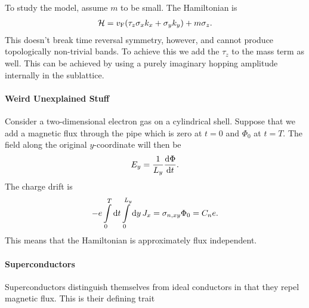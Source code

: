 To study the model, assume $m$ to be small. The Hamiltonian is
\begin{align*}
	\mathcal{H} = v_{\text{F}}(\tau_{z}\sigma_{x}k_{x} + \sigma_{y}k_{y}) + m\sigma_{z}.
\end{align*}
This doesn't break time reversal symmetry, however, and cannot produce topologically non-trivial bands. To achieve this we add the $\tau_{z}$ to the mass term as well. This can be achieved by using a purely imaginary hopping amplitude internally in the sublattice.

\paragraph{Weird Unexplained Stuff}
Consider a two-dimensional electron gas on a cylindrical shell. Suppose that we add a magnetic flux through the pipe which is zero at $t = 0$ and $\Phi_{0}$ at $t = T$. The field along the original $y$-coordinate will then be
\begin{align*}
	E_{y} = \frac{1}{L_{y}}\dv{\Phi}{t}.
\end{align*}
The charge drift is
\begin{align*}
	-e\int\limits_{0}^{T}\dd{t}\int\limits_{0}^{L_{y}}\dd{y}J_{x} = \sigma_{n, xy}\Phi_{0} = C_{n}e.
\end{align*}
This means that the Hamiltonian is approximately flux independent.

\paragraph{Superconductors}
Superconductors distinguish themselves from ideal conductors in that they repel magnetic flux. This is their defining trait


